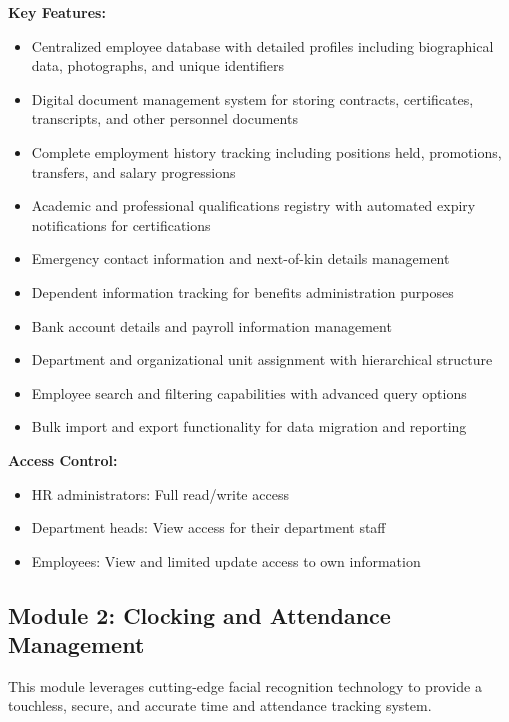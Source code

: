 \documentclass[12pt]{article}
\begin{document}
\textbf{Key Features:}
\begin{itemize}[noitemsep]
\item Centralized employee database with detailed profiles including biographical data, photographs, and unique identifiers
\item Digital document management system for storing contracts, certificates, transcripts, and other personnel documents
\item Complete employment history tracking including positions held, promotions, transfers, and salary progressions
\item Academic and professional qualifications registry with automated expiry notifications for certifications
\item Emergency contact information and next-of-kin details management
\item Dependent information tracking for benefits administration purposes
\item Bank account details and payroll information management
\item Department and organizational unit assignment with hierarchical structure
\item Employee search and filtering capabilities with advanced query options
\item Bulk import and export functionality for data migration and reporting
\end{itemize}

\textbf{Access Control:}
\begin{itemize}[noitemsep]
\item HR administrators: Full read/write access
\item Department heads: View access for their department staff
\item Employees: View and limited update access to own information
\end{itemize}

\subsection{Module 2: Clocking and Attendance Management}

This module leverages cutting-edge facial recognition technology to provide a touchless, secure, and accurate time and attendance tracking system.
\end{document}
